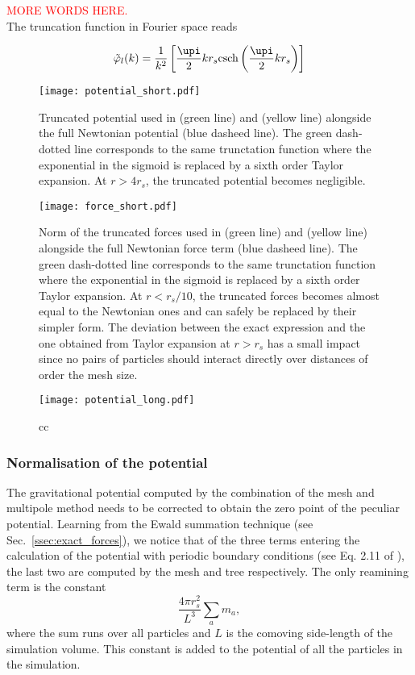 \textcolor{red}{MORE WORDS HERE.}\\

The truncation function in Fourier space reads

\begin{equation}
  \tilde\varphi_l(k) =
  \frac{1}{k^2}\left[\frac{\upi}{2}kr_s\textrm{csch}\left(\frac{\upi}{2}kr_s\right)
    \right]
\end{equation}

\begin{figure}
\texttt{[image: potential\_short.pdf]}
\caption{Truncated potential used in \swift (green line) and \gadget
  (yellow line) alongside the full Newtonian potential (blue dasheed
  line). The green dash-dotted line corresponds to the same
  trunctation function where the exponential in the sigmoid is
  replaced by a sixth order Taylor expansion. At $r>4r_s$, the
  truncated potential becomes negligible.}
\label{fig:fmm:potential_short}
\end{figure}



\begin{figure}
\texttt{[image: force\_short.pdf]}
\caption{Norm of the truncated forces used in \swift (green line) and
  \gadget (yellow line) alongside the full Newtonian force term (blue
  dasheed line). The green dash-dotted line corresponds to the same
  trunctation function where the exponential in the sigmoid is
  replaced by a sixth order Taylor expansion. At $r<r_s/10$, the
  truncated forces becomes almost equal to the Newtonian ones and can
  safely be replaced by their simpler form. The deviation between the
  exact expression and the one obtained from Taylor expansion at
  $r>r_s$ has a small impact since no pairs of particles should
  interact directly over distances of order the mesh size. }
\label{fig:fmm:force_short}
\end{figure}


\begin{figure}
\texttt{[image: potential\_long.pdf]}
\caption{cc}
\label{fig:fmm:potential_long}
\end{figure}


\subsubsection{Normalisation of the potential}

The gravitational potential computed by the combination of the mesh
and multipole method needs to be corrected to obtain the zero point of
the peculiar potential. Learning from the Ewald summation technique
(see Sec.~\ref{ssec:exact_forces}), we notice that of the three terms
entering the calculation of the potential with periodic boundary
conditions (see Eq. 2.11 of \cite{Hernquist1991}), the last two are
computed by the mesh and tree respectively. The only reamining term is
the constant
\begin{equation}
  \frac{4\pi r_s^2}{L^3}\sum_a m_a,
\end{equation}
where the sum runs over all particles and $L$ is the comoving
side-length of the simulation volume. This constant is added to the
potential of all the particles in the simulation.
